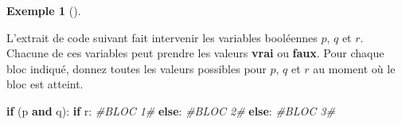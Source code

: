 \documentclass[
  letterpaper,
]{scrbook}
\newenvironment{Shaded}{}{}
\newcommand{\CommentTok}[1]{\textcolor[rgb]{0.38,0.63,0.69}{\textit{#1}}}
\newcommand{\ControlFlowTok}[1]{\textcolor[rgb]{0.00,0.44,0.13}{\textbf{#1}}}
\newcommand{\KeywordTok}[1]{\textcolor[rgb]{0.00,0.44,0.13}{\textbf{#1}}}
\newcommand{\NormalTok}[1]{#1}
\theoremstyle{plain}
\theoremstyle{definition}
\newtheorem{example}{Exemple}[chapter]
\theoremstyle{definition}
\theoremstyle{remark}
\begin{document}
\leavevmode{}%
\begin{example}[]\label{exm-bloc-code}

L'extrait de code suivant fait intervenir les variables booléennes
\(p\), \(q\) et \(r\). Chacune de ces variables peut prendre les valeurs
\textbf{vrai} ou \textbf{faux}. Pour chaque bloc indiqué, donnez toutes
les valeurs possibles pour \(p\), \(q\) et \(r\) au moment où le bloc
est atteint.

\hypertarget{bloc-code-python}{}
\begin{Shaded}
\begin{Highlighting}[]
\ControlFlowTok{if}\NormalTok{ (p }\KeywordTok{and}\NormalTok{ q):}
    \ControlFlowTok{if}\NormalTok{ r:}
        \CommentTok{\#BLOC 1\#}
    \ControlFlowTok{else}\NormalTok{:}
        \CommentTok{\#BLOC 2\#}
\ControlFlowTok{else}\NormalTok{:}
    \CommentTok{\#BLOC 3\#}
\end{Highlighting}
\end{Shaded}


\end{example}
\end{document}
